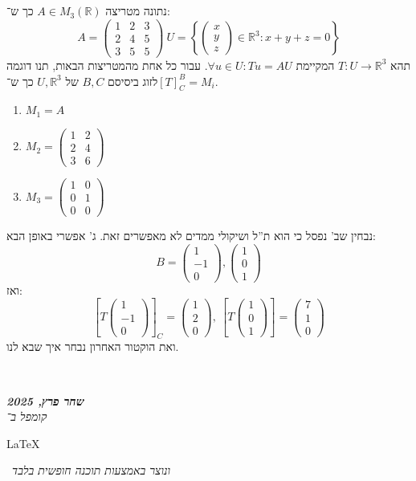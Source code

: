 \documentclass[]{article}
\newcommand\en[1] {\begin{otherlanguage}{english}#1\end{otherlanguage}}
\newcommand\ndoc  {\dotfill \\ \vfil {\begin{center}
			{\textbf{\textit{שחר פרץ, 2025}} \\
				\scriptsize \textit{קומפל ב־}\en{\LaTeX}\,\textit{ ונוצר באמצעות תוכנה חופשית בלבד}}
	\end{center}} \vfil	}
\newcommand\R     {\mathbb{R}}
\newcommand\co        {\colon}
\newcommand\pms[1]    {\begin{pmatrix}
		#1
\end{pmatrix}}
\newcommand\csb[1]    {\left [ #1 \right ]}
\newcommand\ccb[1]    {\left \{ #1 \right \}}
\theoremstyle{definition}
\begin{document}
	\section{}
	נתונה מטריצה $A \in M_3(\R)$ כך ש־: 
	\[ A = \pms{1 & 2 & 3 \\ 2 & 4 & 5 \\ 3 & 5 & 5} \ U = \ccb{\pms{x \\ y \\ z} \in \R^3 \co x + y + z = 0} \]
	תהא $T \co U \to \R^3$ המקיימת $\forall u \in U \co Tu = AU$. עבור כל אחת מהמטריצות הבאות, תנו דוגמה לזוג ביסיסם $B, C$ של $U, \R^3$ כך ש־$[T]^B_C = M_i$. 
	\begin{enumerate}
		\item $M_1 = A$
		\item $M_2 = \pms{1 & 2 \\ 2 & 4 \\ 3 & 6}$
		\item $M_3 = \pms{1 & 0 \\ 0 & 1 \\ 0 & 0}$
	\end{enumerate}
	
	נבחין שב' נפסל כי הוא ת''ל ושיקולי ממדים לא מאפשרים זאת. ג' אפשרי באופן הבא: 
	\[ B = \pms{1 \\ - 1\\ 0}, \pms{1 \\ 0 \\ 1} \]
	ואז: 
	\[ \csb{T\pms{1 \\ - 1\\ 0}}_C = \pms{1 \\ 2 \\ 0}, \ \csb{T\pms{1 \\ 0 \\ 1}} = \pms{7 \\ 1 \\ 0} \]
	ואת הוקטור האחרון נבחר איך שבא לנו. 
	
	
	\ndoc
\end{document}
